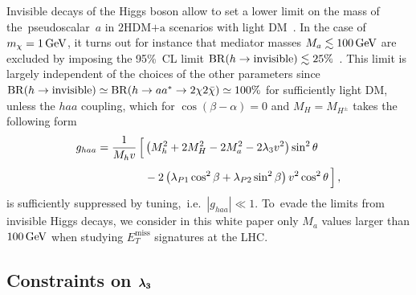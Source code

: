 \documentclass[a4paper, 11pt,notoc]{article}
\newcommand{\MET}{\ensuremath{E_T^\mathrm{miss}}\xspace}
\newcommand{\hdma}{\ensuremath{\textrm{2HDM+a}}\xspace}
\def\bm#1{\mbox{\boldmath$#1$\unboldmath}}
\begin{document}
Invisible decays of the Higgs boson allow to set a lower limit on the mass of  the~pseudoscalar~$a$ in \hdma scenarios with light DM~\cite{Bauer:2017ota}. In the case of $m_\chi = 1 \, {\rm GeV}$, it turns out for instance that mediator masses $M_a \lesssim 100 \, {\rm GeV}$ are excluded by imposing the 95\%~CL limit ${\rm BR} (h \to  \text{invisible}) \lesssim 25\%$~\cite{Aad:2015pla,Khachatryan:2016whc}.  This limit is largely independent of the choices of the other parameters since ${\rm BR} (h \to  \text{invisible}) \simeq {\rm BR} (h \to a a^\ast \to 2 \chi 2 \bar \chi) \simeq 100\%$ for sufficiently light DM, unless  the $haa$ coupling, which for $\cos (\beta-\alpha) = 0$ and $M_H = M_{H^\pm}$ takes the following form~\cite{Bauer:2017ota}
\begin{equation}
\begin{split}
g_{haa} & = \frac{1}{M_h v}  \, \Big [ \left ( M_h^2  + 2 M_H^2  -  2 M_a^2 - 2 \lambda_3 v^2 \right) \sin^2 \theta \\[1mm] &  \hspace{1.5cm} - 2 \left (  \lambda_{P1} \cos^2 \beta + \lambda_{P2} \sin^2 \beta  \right ) v^2 \cos^2 \theta \, \Big ]  \,, 
\end{split}
\end{equation}
is sufficiently suppressed by tuning,~i.e.~$|g_{haa}| \ll 1$. To~evade the limits from invisible Higgs decays, we consider in this white paper only $M_a$ values larger than $100 \, {\rm GeV}$ when studying $\MET$ signatures at the LHC. 

\subsection{Constraints on $\bm{\lambda_3}$}
\end{document}
